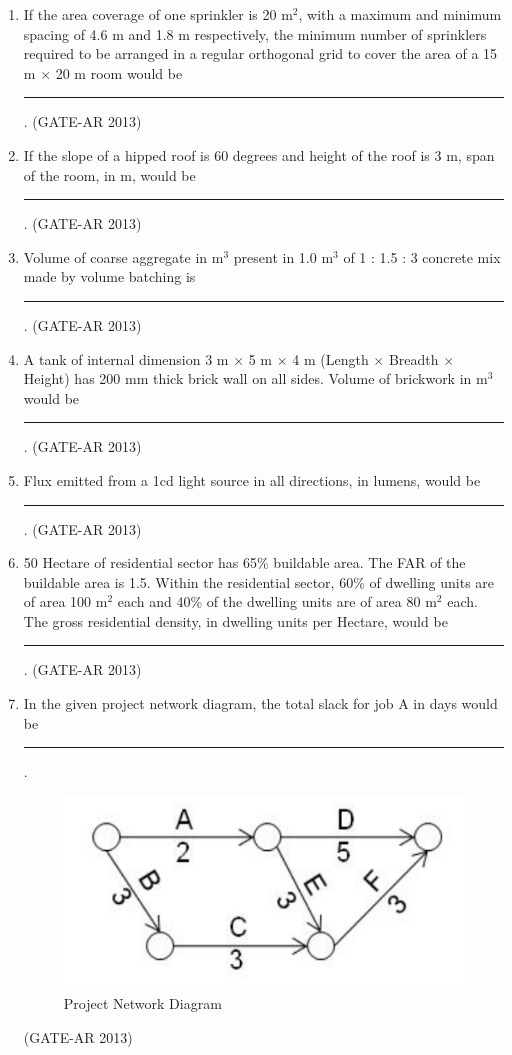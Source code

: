 \documentclass[a4paper,10pt]{article}
\begin{document}
\begin{enumerate}
    \item If the area coverage of one sprinkler is 20 m$^2$, with a maximum and minimum spacing of 4.6 m and 1.8 m respectively, the minimum number of sprinklers required to be arranged in a regular orthogonal grid to cover the area of a 15 m $\times$ 20 m room would be \rule{3cm}{0.4pt}.
    \hfill (GATE-AR 2013)

    \item If the slope of a hipped roof is 60 degrees and height of the roof is 3 m, span of the room, in m, would be \rule{3cm}{0.4pt}.
    \hfill (GATE-AR 2013)

    \item Volume of coarse aggregate in m$^3$ present in 1.0 m$^3$ of 1 : 1.5 : 3 concrete mix made by volume batching is \rule{3cm}{0.4pt}.
    \hfill (GATE-AR 2013)

    \item A tank of internal dimension 3 m $\times$ 5 m $\times$ 4 m (Length $\times$ Breadth $\times$ Height) has 200 mm thick brick wall on all sides. Volume of brickwork in m$^3$ would be \rule{3cm}{0.4pt}.
    \hfill (GATE-AR 2013)

    \item Flux emitted from a 1cd light source in all directions, in lumens, would be \rule{3cm}{0.4pt}.
    \hfill (GATE-AR 2013)

    \item 50 Hectare of residential sector has 65\% buildable area. The FAR of the buildable area is 1.5. Within the residential sector, 60\% of dwelling units are of area 100 m$^2$ each and 40\% of the dwelling units are of area 80 m$^2$ each. \\
    The gross residential density, in dwelling units per Hectare, would be \rule{3cm}{0.4pt}.
    \hfill (GATE-AR 2013)

    \item In the given project network diagram, the total slack for job A in days would be \rule{3cm}{0.4pt}.
    \begin{figure}[h!]
    \centering
    \includegraphics[width=0.5\linewidth]{figs/02.jpg}
    \caption{Project Network Diagram}
    \label{fig:Img02}
    \end{figure}
    \hfill (GATE-AR 2013)


\end{enumerate}
\end{document}
